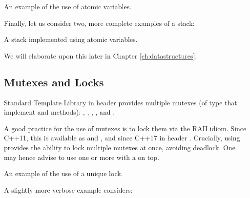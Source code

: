 \begin{itemize}
\begin{end}
\raggedbottom
\begin{codebox}[]{\href{https://godbolt.org/z/M8vbK1zjT}{\ExternalLink}}
\footnotesize An example of the use of atomic variables.
\tcblower
{}
\end{codebox}

Finally, let us consider two, more complete examples of a stack:

\raggedbottom
\begin{codebox}[]{\href{https://godbolt.org/z/Yf7a7G4YG}{\ExternalLink}}
\footnotesize A stack implemented using atomic variables.
\tcblower
{}
\end{codebox}

We will elaborate upon this later in Chapter \ref{ch:datastructures}. 

\subsection{Mutexes and Locks}

Standard Template Library in header 	provides multiple mutexes (of type  that implement  and  methods): , , , , 
and . 

A good practice for the use of mutexes is to lock them via the RAII idiom. Since C++11, this is available as  and , and since C++17  in header .
Crucially, using  provides the ability to lock multiple mutexes at once, avoiding deadlock.
One may hence advise to use one or more  with a  on top. 

\raggedbottom
\begin{codebox}[]{\href{https://godbolt.org/z/85Md13Mea}{\ExternalLink}}
\footnotesize An example of the use of a unique lock.
\tcblower
{}
\end{codebox}


A slightly more verbose example considers:


\end{end}
\end{itemize}
